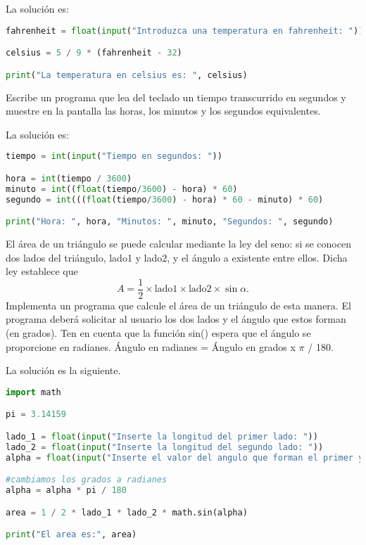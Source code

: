 \documentclass{article}
\begin{document}
\begin{sol}
La solución es:
\begin{lstlisting}[language = Python]
fahrenheit = float(input("Introduzca una temperatura en fahrenheit: "))

celsius = 5 / 9 * (fahrenheit - 32)

print("La temperatura en celsius es: ", celsius)
\end{lstlisting}
\end{sol}

\begin{ej}
Escribe un programa que lea del teclado un tiempo transcurrido en segundos y muestre en la pantalla las horas, los minutos y los segundos equivalentes.
\end{ej}

\begin{sol}
La solución es:
\begin{lstlisting}[language = Python]
tiempo = int(input("Tiempo en segundos: "))

hora = int(tiempo / 3600)
minuto = int((float(tiempo/3600) - hora) * 60)
segundo = int(((float(tiempo/3600) - hora) * 60 - minuto) * 60)

print("Hora: ", hora, "Minutos: ", minuto, "Segundos: ", segundo)
\end{lstlisting}
\end{sol}

\begin{ej}
El área de un triángulo se puede calcular mediante la ley del seno: si se conocen dos lados del triángulo, lado1 y lado2, y el ángulo a existente entre ellos. Dicha ley establece que
\[A = \frac{1}{2} \times \text{lado1} \times \text{lado2} \times \sin\alpha .\]
Implementa un programa que calcule el área de un triángulo de esta manera. El programa deberá solicitar al usuario los dos lados y el ángulo que estos forman (en grados). Ten en cuenta que la función sin() espera que el ángulo se proporcione en radianes. Ángulo en radianes = Ángulo en grados x $\displaystyle \pi $  / 180.
\end{ej}

\begin{sol}
La solución es la siguiente.
\begin{lstlisting}[language = Python]
import math

pi = 3.14159

lado_1 = float(input("Inserte la longitud del primer lado: "))
lado_2 = float(input("Inserte la longitud del segundo lado: "))
alpha = float(input("Inserte el valor del angulo que forman el primer y el segundo lado en grados: "))

#cambiamos los grados a radianes
alpha = alpha * pi / 180

area = 1 / 2 * lado_1 * lado_2 * math.sin(alpha)

print("El area es:", area)
\end{lstlisting}
\end{sol}
\end{document}
